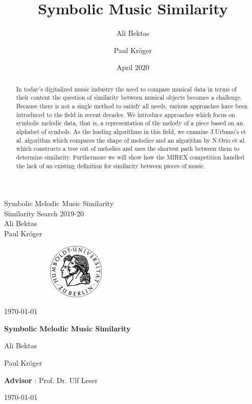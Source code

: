 \documentclass{llncs}
\title{Symbolic Music Similarity}
\author{Ali Bektas \and Paul Kröger}
\date{April 2020}
\begin{document}
	
	\thispagestyle{empty}
   	\begin{center}	
		\vspace{100pt}
		\Huge Symbolic Melodic Music Similarity\\
		\vspace{5pt}
		\Large Similarity Search 2019-20\\
		\vspace{20pt}
		Ali Bektas\\
		Paul Kröger \\
		\vspace{150pt}
		\begin{figure}[h!]
			\centering
	        \includegraphics[width=200px,height=100px,keepaspectratio]{hu-berlin-logo}
        \end{figure}
		\vspace{5pt}
		\Large{\today}
	\end{center}
	
	\newpage
	\tableofcontents
	

	\newpage
	\pagestyle{plain}
	\setcounter{page}{1}
	\begin{center}	

		\large{\textbf{Symbolic Melodic Music Similarity}}\\
		\vspace{5pt} 
		
		\small{Ali Bektas}\\
		\vspace{5pt}

		\small{Paul Kröger}\\
		\vspace{5pt}

		\small{\textbf{Advisor} : Prof. Dr. Ulf Leser}\\
		\vspace{5pt}

		\small{\today}
	\end{center}


	\tableofcontents
	
	\begin{abstract}
	In today's digitalized music industry the need to compare musical data in terms of their content the question of similarity between musical objects becomes a challenge. Because there 
	is not a single method to satisfy all needs, various approaches have been introduced to the field in recent decades. We introduce approaches which focus on symbolic melodic data, that is, a representation of the melody of a piece based on an alphabet of symbols. As the leading algorithms in this field, we examine J.Urbano's et al. algorithm which compares the shape of melodies and an algorithm by N.Orio et al. which constructs a tree out of melodies and uses the shortest path between them to determine similarity. Furthermore we will show how the MIREX competition handled the lack of an existing definition for similarity between pieces of music.
	\end{abstract}
\end{document}
